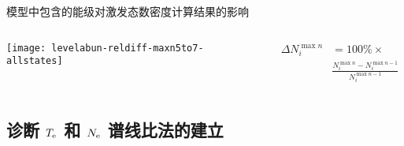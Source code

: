 \begin{frame}{模型中包含的能级对激发态数密度计算结果的影响}%
		\begin{columns}[T]
	\vspace{-0.7cm}
	\begin{center}
		\texttt{[image: levelabun-reldiff-maxn5to7-allstates]}
	\end{center}
	
	\begin{align*}
	   \Delta N_i^{\max n} & = 100\% \times \\
    	 & \frac{N_i^{\max n}-N_i^{\max n-1}}{N_i^{\max n-1}}
	\end{align*}
    \vspace{1em}
	\end{columns}
\end{frame}

%

\subsection{诊断 $T_{\rm e}$ 和 $N_{\rm e}$ 谱线比法的建立}

